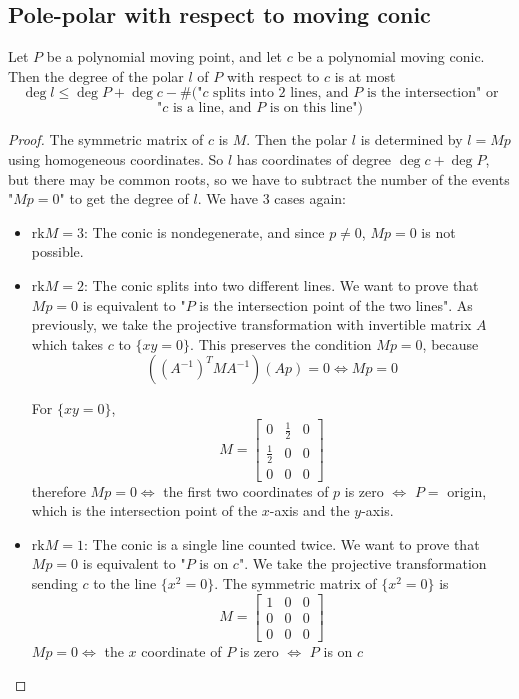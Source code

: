 \documentclass[a4paper]{article}
\begin{document}
\subsection{Pole-polar with respect to moving conic}





\begin{theorem}
    Let $P$ be a polynomial moving point, and let $c$ be a polynomial moving conic. Then the degree of the polar $l$ of $P$ with respect to $c$ is at most
    $$\deg l\le\deg P +\deg c - \#(\text{"$c$ splits into 2 lines, and $P$ is the intersection" or}$$
    $$\text{"$c$ is a line, and $P$ is on this line"})$$
\end{theorem}
\begin{proof}
    The symmetric matrix of $c$ is $M$. Then the polar $l$ is determined by $l=Mp$ using homogeneous coordinates. So $l$ has coordinates of degree $\deg c+\deg P$, but there may be common roots, so we have to subtract the number of the events "$Mp=0$" to get the degree of $l$. We have 3 cases again:
    \begin{itemize}
    \item $\mathrm{rk}M=3$: The conic is nondegenerate, and since $p\ne 0$, $Mp=0$ is not possible.
    \item $\mathrm{rk}M=2$: The conic splits into two different lines. We want to prove that $Mp=0$ is equivalent to "$P$ is the intersection point of the two lines". As previously, we take the projective transformation with invertible matrix $A$ which takes $c$ to $\{xy=0\}$. This preserves the condition $Mp=0$, because
    $$((A^{-1})^TMA^{-1})(Ap)=0 \iff Mp=0$$

    For $\{xy=0\}$,
    $$M=\begin{bmatrix}
0 & \tfrac{1}{2} & 0\\[4pt]
\tfrac{1}{2} & 0 & 0\\[4pt]
0 & 0 & 0
\end{bmatrix}$$
therefore $Mp=0 \iff$ the first two coordinates of $p$ is zero $\iff$ $P=$ origin, which is the intersection point of the $x$-axis and the $y$-axis.
    \item $\mathrm{rk}M=1$: The conic is a single line counted twice. We want to prove that $Mp=0$ is equivalent to "$P$ is on $c$". We take the projective transformation sending $c$ to the line $\{x^2=0\}$. The symmetric matrix of $\{x^2=0\}$ is
    $$M=\begin{bmatrix}
    1 & 0 & 0\\[4pt]
    0 & 0 & 0\\[4pt]
    0 & 0 & 0
    \end{bmatrix}$$
    $Mp=0 \iff$ the $x$ coordinate of $P$ is zero $\iff$ $P$ is on $c$
\end{itemize}
\end{proof}
\end{document}
